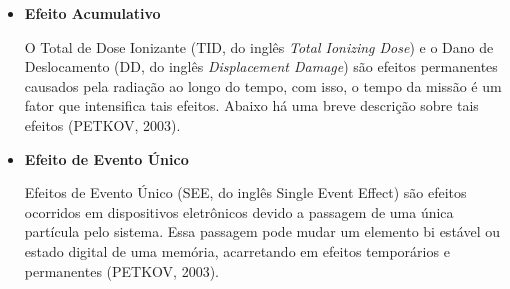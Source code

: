 \begin{itemize}
\item \textbf{Efeito Acumulativo}

O Total de Dose Ionizante (TID, do inglês \textit{Total Ionizing Dose}) e o Dano de Deslocamento (DD, do inglês \textit{Displacement Damage}) são efeitos permanentes causados pela radiação ao longo do tempo, com isso, o tempo da missão é um fator que intensifica tais efeitos. Abaixo há uma breve descrição sobre tais efeitos (PETKOV, 2003).

\begin{table}[h]
\centering
\caption{Efeitos Acumulativos causada pela radiação espacial.}
\label{tabela2}
\end{table}


\item \textbf{ Efeito de Evento Único}

Efeitos de Evento Único (SEE, do inglês Single Event Effect) são efeitos ocorridos em dispositivos eletrônicos devido a passagem de uma única partícula pelo sistema. Essa passagem pode mudar um elemento bi estável ou estado digital de uma memória, acarretando em efeitos temporários e permanentes (PETKOV, 2003).


\end{itemize}
